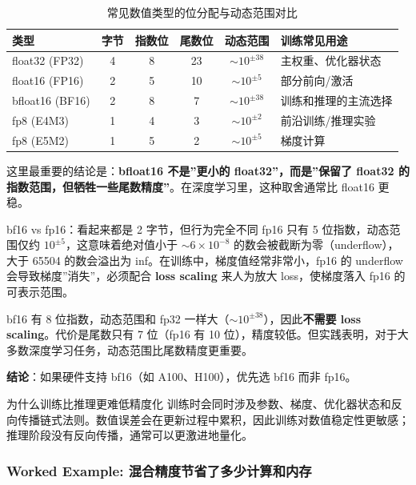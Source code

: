 \documentclass[a4paper]{article}
\begin{document}
\begin{table}[H]
\centering
\begin{tabular}{lccccl}
\toprule
\textbf{类型} & \textbf{字节} & \textbf{指数位} & \textbf{尾数位} & \textbf{动态范围} & \textbf{训练常见用途} \\
\midrule
float32 (FP32) & 4 & 8 & 23 & $\sim 10^{\pm 38}$ & 主权重、优化器状态 \\
float16 (FP16) & 2 & 5 & 10 & $\sim 10^{\pm 5}$ & 部分前向/激活 \\
bfloat16 (BF16) & 2 & 8 & 7 & $\sim 10^{\pm 38}$ & 训练和推理的主流选择 \\
fp8 (E4M3) & 1 & 4 & 3 & $\sim 10^{\pm 2}$ & 前沿训练/推理实验 \\
fp8 (E5M2) & 1 & 5 & 2 & $\sim 10^{\pm 5}$ & 梯度计算 \\
\bottomrule
\end{tabular}
\caption{常见数值类型的位分配与动态范围对比}
\end{table}

这里最重要的结论是：\textbf{bfloat16 不是”更小的 float32”，而是”保留了 float32 的指数范围，但牺牲一些尾数精度”}。在深度学习里，这种取舍通常比 float16 更稳。

\begin{warningbox}{bf16 vs fp16：看起来都是 2 字节，但行为完全不同}
fp16 只有 5 位指数，动态范围仅约 $10^{\pm 5}$，这意味着绝对值小于 $\sim 6 \times 10^{-8}$ 的数会被截断为零（underflow），大于 65504 的数会溢出为 inf。在训练中，梯度值经常非常小，fp16 的 underflow 会导致梯度”消失”，必须配合 \textbf{loss scaling} 来人为放大 loss，使梯度落入 fp16 的可表示范围。

bf16 有 8 位指数，动态范围和 fp32 一样大（$\sim 10^{\pm 38}$），因此\textbf{不需要 loss scaling}。代价是尾数只有 7 位（fp16 有 10 位），精度较低。但实践表明，对于大多数深度学习任务，动态范围比尾数精度更重要。

\textbf{结论}：如果硬件支持 bf16（如 A100、H100），优先选 bf16 而非 fp16。
\end{warningbox}

\begin{importantbox}{为什么训练比推理更难低精度化}
训练时会同时涉及参数、梯度、优化器状态和反向传播链式法则。数值误差会在更新过程中累积，因此训练对数值稳定性更敏感；推理阶段没有反向传播，通常可以更激进地量化。
\end{importantbox}

\subsubsection{Worked Example: 混合精度节省了多少计算和内存}
\end{document}
